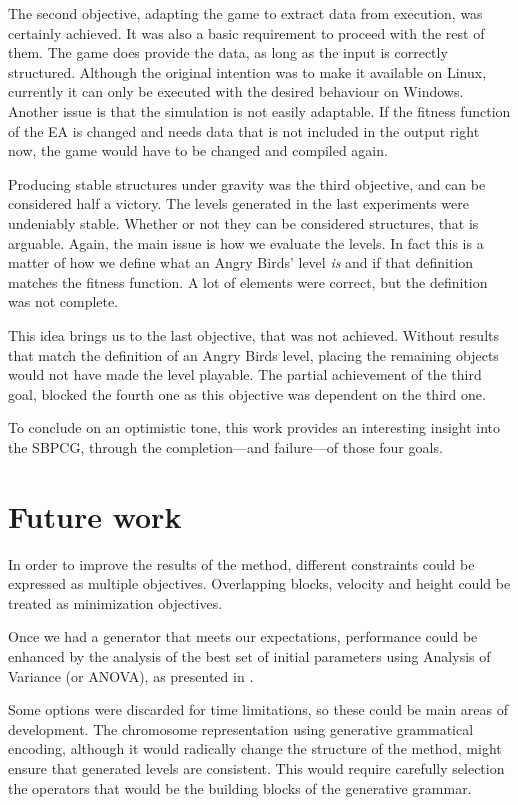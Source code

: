 The second objective, adapting the game to extract data from execution, was certainly achieved. It was also a basic requirement to proceed with the rest of them. The game does provide the data, as long as the input is correctly structured. Although the original intention was to make it available on Linux, currently it can only be executed with the desired behaviour on Windows. Another issue is that the simulation is not easily adaptable. If the fitness function of the \acs{EA} is changed and needs data that is not included in the output right now, the game would have to be changed and compiled again.

Producing stable structures under gravity was the third objective, and can be considered half a victory. The levels generated in the last experiments were undeniably stable. Whether or not they can be considered structures, that is arguable. Again, the main issue is how we evaluate the levels. In fact this is a matter of how we define what an Angry Birds' level \textit{is} and if that definition matches the fitness function. A lot of elements were correct, but the definition was not complete.

This idea brings us to the last objective, that was not achieved. Without results that match the definition of an Angry Birds level, placing the remaining objects would not have made the level playable. The partial achievement of the third goal, blocked the fourth one as this objective was dependent on the third one.

To conclude on an optimistic tone, this work provides an interesting insight into the \acf{SBPCG}, through the completion---and failure---of those four goals.

\section{Future work}

In order to improve the results of the method, different constraints could be expressed as multiple objectives. Overlapping blocks, velocity and height could be treated as minimization objectives.

Once we had a generator that meets our expectations, performance could be enhanced by the analysis of the best set of initial parameters using Analysis of Variance (or ANOVA), as presented in \cite{estevez2017statistical}. 

Some options were discarded for time limitations, so these could be main areas of development. The chromosome representation using generative grammatical encoding\cite{hornby2001advantages}, although it would radically change the structure of the method, might ensure that generated levels are consistent. This would require carefully selection the operators that would be the building blocks of the generative grammar.

